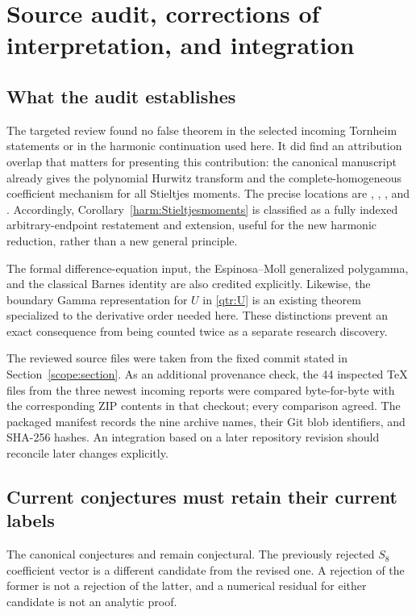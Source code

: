 \section{Source audit, corrections of interpretation, and integration}
\label{audit:section}

\subsection{What the audit establishes}

The targeted review found no false theorem in the selected incoming
Tornheim statements or in the harmonic continuation used here. It
did find an attribution overlap that matters for presenting this
contribution: the canonical manuscript already gives the polynomial
Hurwitz transform and the complete-homogeneous coefficient mechanism
for all Stieltjes moments. The precise locations are
,
,
, and
 \cite{source:manuscript}.
Accordingly, Corollary~\ref{harm:Stieltjesmoments} is classified as a
fully indexed arbitrary-endpoint restatement and extension, useful
for the new harmonic reduction, rather than a new general principle.

The formal difference-equation input, the Espinosa--Moll generalized
polygamma, and the classical Barnes identity are also credited
explicitly. Likewise, the boundary Gamma representation for $U$ in
\eqref{qtr:U} is an existing theorem specialized to the derivative
order needed here. These distinctions prevent an exact consequence
from being counted twice as a separate research discovery.

The reviewed source files were taken from the fixed commit stated in
Section~\ref{scope:section}. As an additional provenance check, the
44 inspected TeX files from the three newest incoming reports were
compared byte-for-byte with the corresponding ZIP contents in that
checkout; every comparison agreed. The packaged manifest records
the nine archive names, their Git blob identifiers, and SHA-256
hashes. An integration based on a later repository revision should
reconcile later changes explicitly.

\subsection{Current conjectures must retain their current labels}

The canonical conjectures
 and 
remain conjectural. The previously rejected $S_8$ coefficient vector
is a different candidate from the revised one. A rejection of the
former is not a rejection of the latter, and a numerical residual
for either candidate is not an analytic proof.

